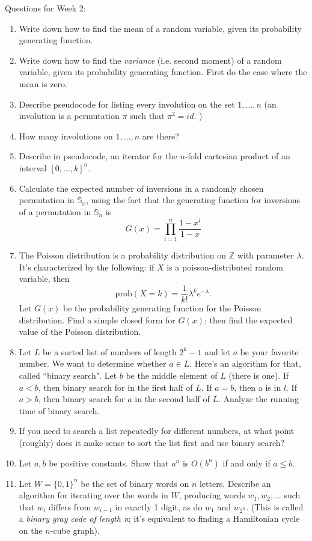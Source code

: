 \documentclass[12pt]{article}
\begin{document}
Questions for Week 2: 
\begin{enumerate}
	\item Write down how to find the mean of a random variable, given its probability generating function.
	\item Write down how to find the \emph{variance} (i.e. second moment) of a random variable, given its probability generating function.  First do the case where the mean is zero.
	\item Describe pseudocode for listing every involution on the set $1, \dots, n$ (an involution is a permutation $\pi$ such that $\pi^2=id$. )
	\item How many involutions on $1, \dots, n$ are there?
	\item Describe in pseudocode, an iterator for the $n$-fold cartesian product of an interval $[0, \dots, k]^n$.
	\item Calculate the expected number of inversions in a randomly chosen permutation in $\mathbb{S_n}$, using the fact that the generating function for inversions of a permutation in $\mathbb{S}_n$ is $$G(x) = \prod_{i=1}^n \frac{1-x^i}{1-x}$$
	\item The Poisson distribution is a probability distribution on $\mathbb{Z}$ with parameter $\lambda$.  It's characterized by the following: if $X$ is a poisson-distributed random variable, then $$\text{prob}(X=k) = \frac{1}{k!}\lambda^k e^{-\lambda}.$$ Let $G(x)$ be the probability generating function for the Poisson distribution.  Find a simple closed form for $G(x)$; then find the expected value of the Poisson distribution.
	\item Let $L$ be a sorted list of numbers of length $2^k-1$ and let $a$ be your favorite number.  We want to determine whether $a \in L$.  Here's an algorithm for that, called ``binary search".  Let $b$ be the middle element of $L$ (there is one).   If $a < b$,  then binary search for  in the first half of $L$.  If $a=b$, then a is in $l$.  If $a > b$, then binary search for $a$ in the second half of $L$.   Analyze the running time of binary search.
	\item If you need to search a list repeatedly for different numbers, at what point (roughly) does it make sense to sort the list first and use binary search?
	\item Let $a,b$ be positive constants. Show that $a^n$ is $O(b^n)$ if and only if $a \leq b$.
	\item Let $W = \{0,1\}^n$ be the set of binary words on $n$ letters.   Describe an algorithm for iterating over the words in $W$, producing words $w_1, w_2, \dots$ such that $w_i$ differs from $w_{i-1}$ in exactly 1 digit, as do $w_1$ and $w_{2^n}$.  (This is called a \emph{binary gray code of length n}; it's equivalent to finding a Hamiltonian cycle on the $n$-cube graph).

\end{enumerate}
\end{document}
